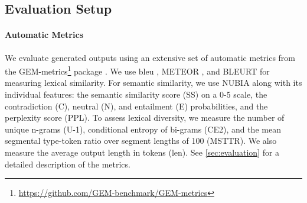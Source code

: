 \subsection{Evaluation Setup}
\paragraph{Automatic Metrics}


We evaluate generated outputs using an extensive set of automatic metrics from the GEM-metrics\footnote{\url{https://github.com/GEM-benchmark/GEM-metrics}} package \cite{gehrmannGEMBenchmarkNatural2021}. We use \acs{bleu} \cite{papineni2002bleu}, \mbox{METEOR} \cite{banerjee-lavie-2005-meteor}, and BLEURT \cite{sellam2020bleurt} for measuring lexical similarity. For semantic similarity, we use NUBIA \cite{kaneNUBIANeUralBased2020} along with its individual features: the semantic similarity score (SS) on a 0-5 scale, the contradiction (C), neutral (N), and entailment (E) probabilities, and the perplexity score (PPL). To assess lexical diversity, we measure the number of unique n-grams (U-1), conditional entropy of bi-grams (CE2), and the mean segmental type-token ratio over segment lengths of 100 (MSTTR). We also measure the average output length in tokens (len). See \autoref{sec:evaluation} for a detailed description of the metrics.



